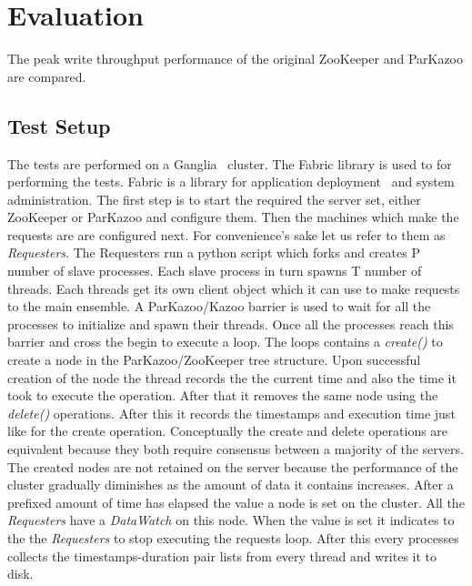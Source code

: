 \chapter{Evaluation}

The peak write throughput performance of the original ZooKeeper and ParKazoo are compared.

\section{Test Setup}
The tests are performed on a Ganglia~\cite{sacerdoti2003wide} cluster. The Fabric library is used to for performing the tests. Fabric is a library for application deployment~\cite{spotswood2003systems} and system administration. The first step is to start the required the server set, either ZooKeeper or ParKazoo and configure them. Then the machines which make the requests are are configured next. For convenience's sake let us refer to them as \textit{Requesters}. The Requesters run a python script which forks and creates P number of slave processes. Each slave process in turn spawns T number of threads. Each threads get its own client object which it can use to make requests to the main ensemble. A ParKazoo/Kazoo barrier is used to wait for all the processes to initialize and spawn their threads. Once all the processes reach this barrier and cross the begin to execute a loop. The loops contains a \textit{create()} to create a node in the ParKazoo/ZooKeeper tree structure. Upon successful creation of the node the thread records the the current time and also the time it took to execute the operation. After that it removes the same node using the \textit{delete()} operations. After this it records the timestamps and execution time just like for the create operation. Conceptually the create and delete operations are equivalent because they both require consensus between a majority of the servers. The created nodes are not retained on the server because the performance of the cluster gradually diminishes as the amount of data it contains increases. After a prefixed amount of time has elapsed the value a node is set on the cluster. All the \textit{Requesters} have a \textit{DataWatch} on this node. When the value is set it indicates to the the \textit{Requesters} to stop executing the requests loop. After this every processes collects the timestamps-duration pair lists from every thread and writes it to disk. 


